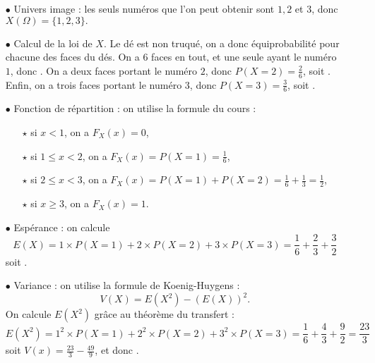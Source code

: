 \documentclass[a4paper, 11pt,reqno]{article}
\begin{document}
\begin{correction}   \;
	\begin{itemize}
		\item[$\bullet$] Univers image : les seuls num\'eros que l'on peut obtenir sont $1,2$ et $3$, donc $X(\Omega) = \{1,2,3\}.$
		\item[$\bullet$] Calcul de la loi de $X$. Le d\'e est non truqu\'e, on a donc \'equiprobabilit\'e pour chacune des faces du d\'es. On a $6$ faces en tout, et une seule ayant le num\'ero $1$, donc . On a deux faces portant le num\'ero $2$, donc $P(X=2) = \frac{2}{6}$, soit . Enfin, on a trois faces portant le num\'ero $3$, donc $P(X=3) = \frac{3}{6}$, soit .
		\item[$\bullet$] Fonction de r\'epartition : on utilise la formule du cours :
			\begin{itemize}
				\item[$\star$] si $x<1$, on a $F_X(x) = 0$,
				\item[$\star$] si $1\leq x < 2$, on a $F_X(x) = P(X =1) = \frac{1}{6}$,
				\item[$\star$] si $2\leq x < 3$, on a $F_X(x) = P(X =1) + P(X=2) = \frac{1}{6} + \frac{1}{3} = \frac{1}{2}$,
				\item[$\star$] si $x\geq 3$, on a $F_X(x) = 1$.
			\end{itemize}
		\item[$\bullet$] Esp\'erance : on calcule
			$$E(X) = 1\times P(X =1) + 2\times P(X =2) + 3\times P(X =3) = \frac{1}{6} + \frac{2}{3} + \frac{3}{2}$$
			soit .
		\item[$\bullet$] Variance : on utilise la formule de Koenig-Huygens :
			$$V(X) = E(X^2) - (E(X))^2.$$
			On calcule $E(X^2)$ gr\^ace au th\'eor\`eme du transfert :
			$$E(X^2) = 1^2 \times P(X =1) + 2^2\times P(X =2) + 3^2\times P(X =3) = \frac{1}{6} + \frac{4}{3} + \frac{9}{2}=\frac{23}{3}$$
			soit $V(x) = \frac{23}{3} - \frac{49}{9}$, et donc .
	\end{itemize}
\end{correction}
\end{document}
